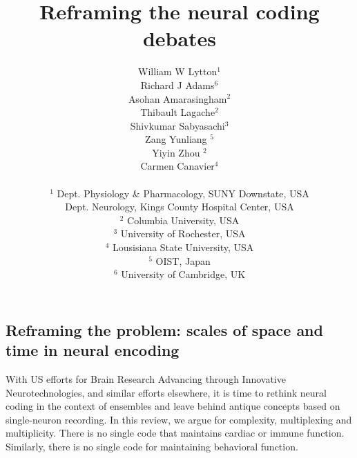 \documentclass[12pt]{article}
\begin{document}
\title{Reframing the neural coding debates}
\author{
William W Lytton$^1$\\
Richard J Adams$^6$ \\
Asohan Amarasingham$^2$ \\
Thibault Lagache$^2$ \\
Shivkumar Sabyasachi$^3$ \\
Zang Yunliang $^5$ \\
Yiyin Zhou $^2$\\
Carmen Canavier$^{4}$\\
\\
$^1$ Dept. Physiology \& Pharmacology, SUNY Downstate, USA\\Dept. Neurology, Kings County Hospital Center, USA \\
$^2$ Columbia University, USA \\
$^3$ University of Rochester, USA \\
$^4$ Lousisiana State University, USA \\
$^5$ OIST, Japan \\ 
$^6$ University of Cambridge, UK \\
}
\maketitle



\subsection*{Reframing the problem: scales of space and time in neural encoding}

With US efforts for Brain Research Advancing through Innovative Neurotechnologies, and similar efforts elsewhere, it is time to rethink
neural coding in the context of ensembles and leave behind antique concepts based on single-neuron recording.
In this review, we argue for complexity, multiplexing and multiplicity.  There is no single code that maintains cardiac or immune function. 
Similarly, there is no single code for maintaining behavioral function.
\end{document}
